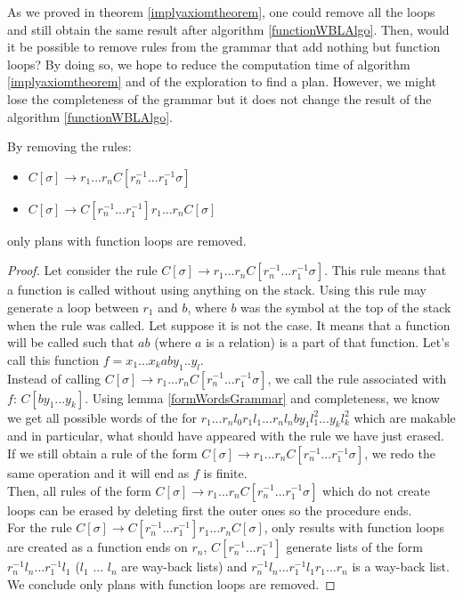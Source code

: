 \documentclass[10pt,a4paper,draft]{article}
\begin{document}
As we proved in theorem \ref{implyaxiomtheorem}, one could remove all the loops and still obtain the same result after algorithm \ref{functionWBLAlgo}. Then, would it be possible to remove rules from the grammar that add nothing but function loops? By doing so, we hope to reduce the computation time of algorithm \ref{implyaxiomtheorem} and of the exploration to find a plan. However, we might lose the completeness of the grammar but it does not change the result of the algorithm \ref{functionWBLAlgo}.\\

\begin{theorem}
By removing the rules:
\begin{itemize}
 \item $C[\sigma] \rightarrow r_1 ... r_n C[r_{n}^{-1} ... r_1^{-1} \sigma]$
 \item $C[\sigma] \rightarrow C[r_{n}^{-1} ... r_1^{-1}] r_1 ... r_n C[\sigma]$
\end{itemize}
only plans with function loops are removed.
\end{theorem}

\begin{proof}
Let consider the rule $C[\sigma] \rightarrow r_1 ... r_n C[r_{n}^{-1} ... r_1^{-1} \sigma]$. This rule means that a function is called without using anything on the stack. Using this rule may generate a loop between $r_1$ and $b$, where $b$ was the symbol at the top of the stack when the rule was called. Let suppose it is not the case. It means that a function will be called such that  $a b$ (where $a$ is a relation) is a part of that function. Let's call this function $f = x_1 ... x_k a b y_1 .. y_l$.\\
Instead of calling $C[\sigma] \rightarrow r_1 ... r_n C[r_{n}^{-1} ... r_1^{-1} \sigma]$, we call the rule associated with $f$: $C[b y_1 ... y_k]$. Using lemma \ref{formWordsGrammar} and completeness, we know we get all possible words of the for $r_1 ... r_n l_0 r_1 l_1 ... r_n l_n b y_1 l_1^2... y_k l_k^2$ which are makable and in particular, what should have appeared with the rule we have just erased. If we still obtain a rule of the form $C[\sigma] \rightarrow r_1 ... r_n C[r_{n}^{-1} ... r_1^{-1} \sigma]$, we redo the same operation and it will end as $f$ is finite.\\
Then, all rules of the form $C[\sigma] \rightarrow r_1 ... r_n C[r_{n}^{-1} ... r_1^{-1} \sigma]$ which do not create loops can be erased by deleting first the outer ones so the procedure ends.\\
For the rule $C[\sigma] \rightarrow C[r_{n}^{-1} ... r_1^{-1}] r_1 ... r_n C[\sigma]$, only results with function loops are created as a function ends on $r_n$, $C[r_{n}^{-1} ... r_1^{-1}]$ generate lists of the form $r_{n}^{-1} l_n ... r_1^{-1} l_1$ ($l_1$ ... $l_n$ are way-back lists) and $r_{n}^{-1} l_n ... r_1^{-1} l_1 r_1 ... r_n$ is a way-back list.\\
We conclude only plans with function loops are removed.
\end{proof}
\end{document}
